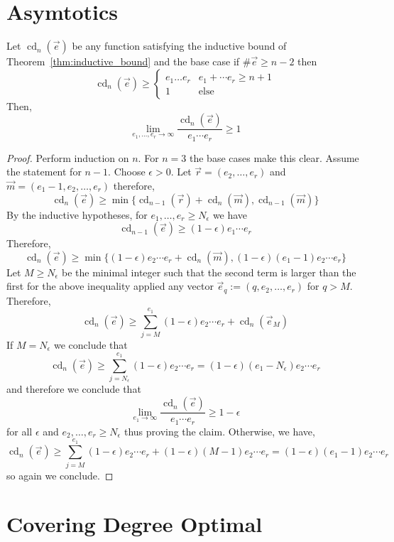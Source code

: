 \documentclass[12pt]{article}
\DeclareMathOperator{\cd}{\text{cd}}
\begin{document}
\section{Asymtotics}


\begin{prop}
Let $\cd_n(\vec{e})$ be any function satisfying the inductive bound of Theorem~\ref{thm:inductive_bound} and the base case if $\# \vec{e} \ge n - 2$ then
\[ \cd_n(\vec{e}) \ge 
\begin{cases}
e_1 \dots e_r & e_1 + \cdots e_r \ge n + 1
\\
1 & \text{else}
\end{cases} \]
Then,
\[ \lim_{e_1, \dots, e_r \to \infty} \frac{\cd_n(\vec{e})}{e_1 \cdots e_r} \ge 1 \]
\end{prop}

\begin{proof}
Perform induction on $n$. For $n = 3$ the base cases make this clear. Assume the statement for $n-1$. Choose $\epsilon > 0$. Let $\vec{r} = (e_2, \dots, e_r)$ and $\vec{m} = (e_1 - 1, e_2, \dots, e_r)$ therefore,
\[ \cd_n(\vec{e}) \ge \min \{ \cd_{n-1}(\vec{r}) + \cd_{n}(\vec{m}), \cd_{n-1}(\vec{m}) \} \]
By the inductive hypotheses, for $e_1, \dots, e_r \ge N_{\epsilon}$ we have
\[ \cd_{n-1}(\vec{e}) \ge (1 - \epsilon) e_1 \cdots e_r \] 
Therefore, 
\[ \cd_n(\vec{e}) \ge \min \{ (1 - \epsilon) e_2 \cdots e_r + \cd_n(\vec{m}), (1 - \epsilon) (e_1 - 1) e_2 \cdots e_r \} \]
Let $M \ge N_\epsilon$ be the minimal integer such that the second term is larger than the first for the above inequality applied any vector $\vec{e}_q := (q, e_2, \dots, e_r)$ for $q > M$. Therefore, 
\[ \cd_n(\vec{e}) \ge \sum_{j = M}^{e_1} (1- \epsilon) e_2 \cdots e_r + \cd_n(\vec{e}_M) \]
If $M = N_\epsilon$ we conclude that 
\[ \cd_n(\vec{e}) \ge \sum_{j = N_\epsilon}^{e_1} (1 - \epsilon) e_2 \cdots e_r = (1 - \epsilon) (e_1 - N_\epsilon) e_2 \cdots e_r \]
and therefore we conclude that
\[ \lim_{e_1 \to \infty} \frac{\cd_n(\vec{e})}{e_1 \cdots e_r} \ge 1 - \epsilon \]
for all $\epsilon$ and $e_2, \dots, e_r \ge N_\epsilon$ thus proving the claim. Otherwise, we have,
\[ \cd_n(\vec{e}) \ge \sum_{j = M}^{e_1} (1 - \epsilon) e_2 \cdots e_r + (1 - \epsilon) (M - 1) e_2 \cdots e_r = (1 - \epsilon) (e_1 - 1) e_2 \cdots e_r \]
so again we conclude.
\end{proof}

\section{Covering Degree Optimal}
\end{document}
